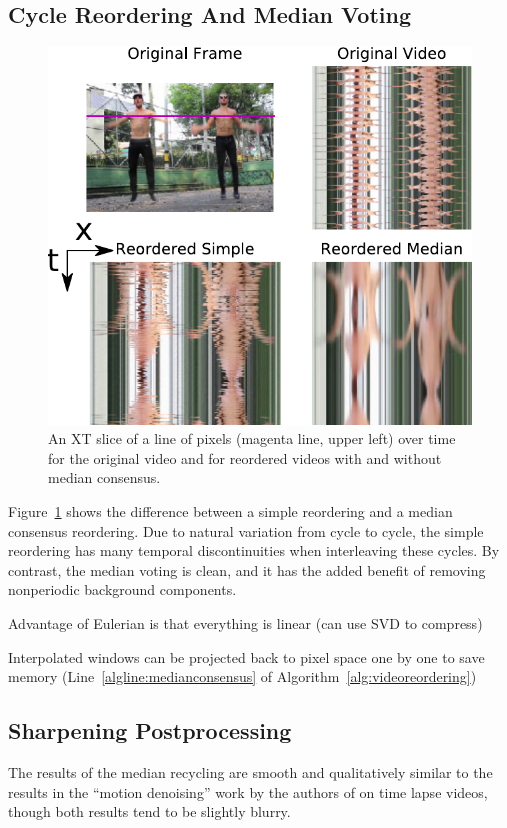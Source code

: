 \documentclass{article}
\begin{document}
\subsection{Cycle Reordering And Median Voting}
\label{sec:cyclereordering}

\begin{figure}[h!]
\centering
\includegraphics[width=0.8\columnwidth]{XTSlice.pdf}
\caption{An XT slice of a line of pixels (magenta line, upper left) over time for the original video and for reordered videos with and without median consensus.}
\label{fig:XTSlice}
\end{figure}

Figure~\ref{fig:XTSlice} shows the difference between a simple reordering and a median consensus reordering.  Due to natural variation from cycle to cycle, the simple reordering has many temporal discontinuities when interleaving these cycles.  By contrast, the median voting is clean, and it has the added benefit of removing nonperiodic background components.

Advantage of Eulerian is that everything is linear (can use SVD to compress)

Interpolated windows can be projected back to pixel space one by one to save memory (Line~\ref{algline:medianconsensus} of Algorithm~\ref{alg:videoreordering})

\subsection{Sharpening Postprocessing}

The results of the median recycling are smooth and qualitatively similar to the results in the ``motion denoising'' work by the authors of \cite{rubinstein2011motion} on time lapse videos, though both results tend to be slightly blurry.
\end{document}
